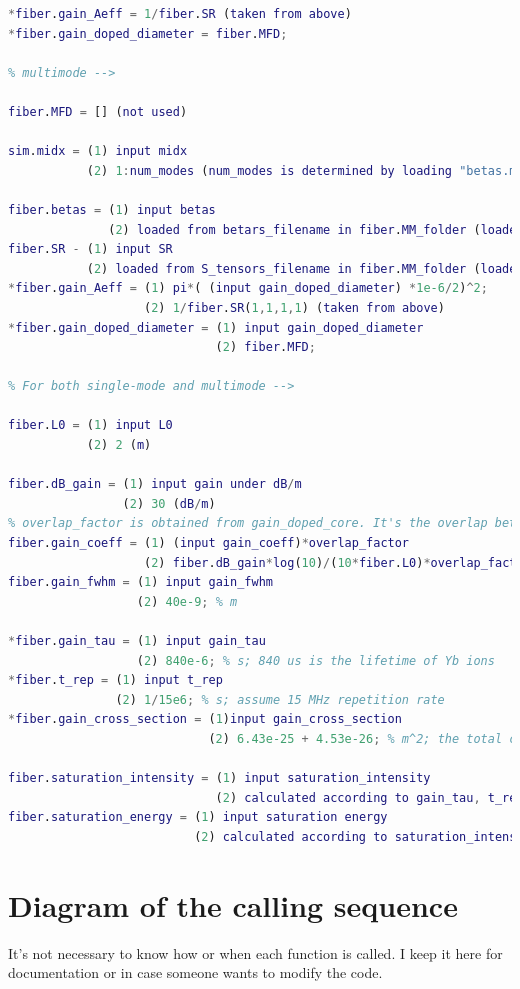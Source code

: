 \documentclass[12pt,hidelinks]{book}
\begin{document}
\begin{lstlisting}[language=MATLAB]
*fiber.gain_Aeff = 1/fiber.SR (taken from above)
*fiber.gain_doped_diameter = fiber.MFD;

% multimode -->

fiber.MFD = [] (not used)

sim.midx = (1) input midx
           (2) 1:num_modes (num_modes is determined by loading "betas.mat")

fiber.betas = (1) input betas
              (2) loaded from betars_filename in fiber.MM_folder (loaded modes are based on the above midx)
fiber.SR - (1) input SR
           (2) loaded from S_tensors_filename in fiber.MM_folder (loaded modes are based on the above midx)
*fiber.gain_Aeff = (1) pi*( (input gain_doped_diameter) *1e-6/2)^2;
                   (2) 1/fiber.SR(1,1,1,1) (taken from above)
*fiber.gain_doped_diameter = (1) input gain_doped_diameter
                             (2) fiber.MFD;

% For both single-mode and multimode -->

fiber.L0 = (1) input L0
           (2) 2 (m)

fiber.dB_gain = (1) input gain under dB/m
                (2) 30 (dB/m)
% overlap_factor is obtained from gain_doped_core. It's the overlap between the mode fields and the doped core.
fiber.gain_coeff = (1) (input gain_coeff)*overlap_factor
                   (2) fiber.dB_gain*log(10)/(10*fiber.L0)*overlap_factor; % m^-1, from db/m
fiber.gain_fwhm = (1) input gain_fwhm
                  (2) 40e-9; % m

*fiber.gain_tau = (1) input gain_tau
                  (2) 840e-6; % s; 840 us is the lifetime of Yb ions
*fiber.t_rep = (1) input t_rep
               (2) 1/15e6; % s; assume 15 MHz repetition rate
*fiber.gain_cross_section = (1)input gain_cross_section
                            (2) 6.43e-25 + 4.53e-26; % m^2; the total cross section of Yb ions at 1030 nm

fiber.saturation_intensity = (1) input saturation_intensity
                             (2) calculated according to gain_tau, t_rep, and gain_cross_section above
fiber.saturation_energy = (1) input saturation energy
                          (2) calculated according to saturation_intensity and gain_Aeff above
\end{lstlisting}

\chapter{Diagram of the calling sequence}
It's not necessary to know how or when each function is called. I keep it here for documentation or in case someone wants to modify the code.
\end{document}
